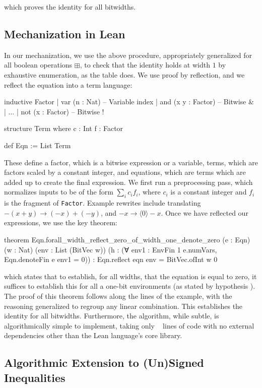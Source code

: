 which proves the identity for all bitwidths.

\subsection{Mechanization in Lean}

In our mechanization, we use the above procedure, appropriately generalized for all boolean
operations $\boxplus$, to check that the identity holds at width $1$ by exhaustive enumeration, as the table does.
We use proof by reflection, and we reflect the equation into a term language:

\begin{lean}
inductive Factor
| var (n : Nat) -- Variable index
| and (x y : Factor) -- Bitwise &
| ...
| not (x : Factor) -- Bitwise !

structure Term where
  c : Int
  f : Factor

def Eqn := List Term
\end{lean}

These define a factor, which is a bitwise expression or a variable, terms, which are factors
scaled by a constant integer, and equations, which are terms which are added up to create
the final expression. We first run a preprocessing pass, which normalizes inputs to be of
the form $\sum_i c_i f_i$, where $c_i$ is a constant integer and $f_i$ is the fragment of \texttt{Factor}.
Example rewrites include translating $- (x + y) \to (-x) + (-y)$, and $-x \to \langle 0 \rangle - x$.
Once we have reflected our expressions, we use the key theorem:
%
\begin{lean}
theorem Eqn.forall_width_reflect_zero_of_width_one_denote_zero
    (e : Eqn) (w : Nat) (env : List (BitVec w))
    (h : (∀ env1 : EnvFin 1 e.numVars, Eqn.denoteFin e env1 = 0)) :
    Eqn.reflect eqn env = BitVec.ofInt w 0
\end{lean}
%
which states that to establish, for all widths, that the equation  is equal to zero,
it suffices to establish this for all a one-bit environments (as stated by hypothesis ).
The proof of this theorem follows along the lines of the example, with the reasoning generalized
to regroup any linear combination. This establishes the identity for all bitwidths.
Furthermore, the algorithm, while subtle, is algorithmically simple to implement,
taking only ~\MBATotalLines{} lines of code with no external dependencies other than
the Lean language's core library.

\subsection{Algorithmic Extension to (Un)Signed Inequalities}

